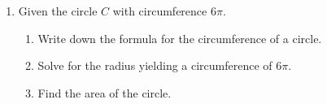 \documentclass[12pt, oneside]{article}
\begin{document}
\begin{enumerate}
  \item Given the circle $C$ with circumference $6\pi$.
  \begin{enumerate}
    \item Write down the formula for the circumference of a circle. \vspace{1.5cm}
    \item Solve for the radius yielding a circumference of $6\pi$. \vspace{2cm}
    \item Find the area of the circle.
  \end{enumerate}

  \end{enumerate}
\end{document}
